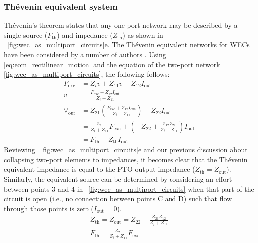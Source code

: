 \documentclass[lettersize,journal]{IEEEtran}
\begin{document}
\subsubsection{Th\'{e}venin equivalent system}\label{sec:thevenin_equivalent_system}
Th\'{e}venin's theorem \cite{Thevenin:1883aa} states that any one-port network may be described by a single source ($F_{\textrm{th}}$) and impedance ($Z_{\textrm{th}}$) as shown in \figurename~\ref{fig:wec_as_multiport_circuits}e.
The Th\'{e}venin equivalent networks for WECs have been considered by a number of authors \cite{Bacelli:2021aa,Blanco:2019aa,Bubbar:2018aa,Lewis:2013aa}.
Using \eqref{eq:eom_rectilinear_motion} and the equation of the two-port network \eqref{fig:wec_as_multiport_circuits}, the following follows:
\begin{equation}
        \nonumber
        \begin{split}
                F_{\textrm{exc}} &= Z_i v + Z_{11} v - Z_{12}I_{\textrm{out}} \\
                v &= \frac{F_{\textrm{exc}} + Z_{12}I_{\textrm{out}} }{Z_i + Z_{11}} \\
                \forall_{\textrm{out}}  &= Z_{21}\left(\frac{F_{\textrm{exc}} + Z_{12}I_{\textrm{out}} }{Z_i + Z_{11}}\right) - Z_{22}I_{\textrm{out}} \\
                &= \frac{Z_{21}}{Z_i + Z_{11}} F_\textrm{exc} + \left( - Z_{22} + \frac{Z_{12}Z_{21}}{Z_i + Z_{11}}\right) I_{\textrm{out}} \\
                &= F_{\textrm{th}} - Z_{\textrm{th}}I_{\textrm{out}}
        \end{split}
\end{equation}
Reviewing \figurename~\ref{fig:wec_as_multiport_circuits}e and our previous discussion about collapsing two-port elements to impedances, it becomes clear that the Th\'{e}venin equivalent impedance is equal to the PTO output impedance ($Z_{\textrm{th}} = Z_{\textrm{out}}$).
Similarly, the equivalent source can be determined by considering an effort between points 3 and 4 in \figurename~\ref{fig:wec_as_multiport_circuits} when that part of the circuit is open (i.e., no connection between points C and D) such that flow through those points is zero ($I_{\textrm{out}}=0$).
\begin{subequations}
\begin{gather}
        Z_{\textrm{th}} = Z_{\textrm{out}} = Z_{22} - \frac{Z_{21} Z_{12}}{Z_{i} + Z_{11}} \label{eq:Thevenin_impedance} \\[0.5em]
        F_{\textrm{th}} = \frac{Z_{21}}{Z_i + Z_{11}}F_{\textrm{exc}}  \label{eq:Thevenin_force}
\end{gather}
\end{subequations}
\end{document}
